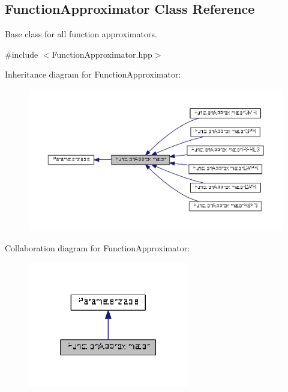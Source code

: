 \hypertarget{classDmpBbo_1_1FunctionApproximator}{\subsection{Function\+Approximator Class Reference}
\label{classDmpBbo_1_1FunctionApproximator}
}


Base class for all function approximators.  




{\ttfamily \#include $<$Function\+Approximator.\+hpp$>$}



Inheritance diagram for Function\+Approximator\+:
\nopagebreak
\begin{figure}[H]
\begin{center}
\leavevmode
\includegraphics[width=350pt]{classDmpBbo_1_1FunctionApproximator__inherit__graph}
\end{center}
\end{figure}


Collaboration diagram for Function\+Approximator\+:
\nopagebreak
\begin{figure}[H]
\begin{center}
\leavevmode
\includegraphics[width=199pt]{classDmpBbo_1_1FunctionApproximator__coll__graph}
\end{center}
\end{figure}
